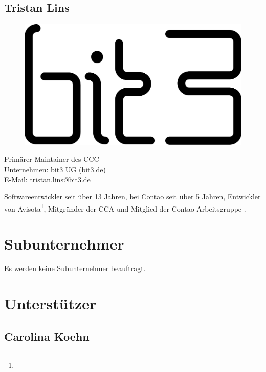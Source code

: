\documentclass[
paper=a4,
draft=false,%
fontsize=10pt%
]{scrartcl}
\begin{document}
\subsection*{Tristan  Lins}

\begin{figure}
  \vspace{-40pt}
  \hfill
  \includegraphics[width=.2\textwidth]{bilder/bit3}
\end{figure}

Primärer Maintainer des CCC \\
Unternehmen: bit3 UG (\href{https://bit3.de}{bit3.de}) \\
E-Mail: \href{mailto:tristan.lins@bit3.de}{tristan.lins@bit3.de}

Softwareentwickler seit über 13 Jahren, bei Contao seit über 5 Jahren, Entwickler von Avisota\footnote{}, Mitgründer der CCA und Mitglied der Contao Arbeitsgruppe .

\newpage

%
%

\section{Subunternehmer}
\label{sec:contractor}

Es werden keine Subunternehmer beauftragt.

\newpage

%
%

\section{Unterstützer}
\label{sec:backers}

\subsection*{Carolina  Koehn}
\end{document}
